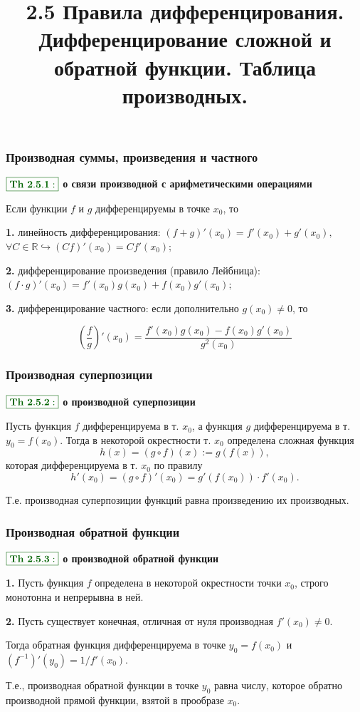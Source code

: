 \documentclass[8pt, aspectratio=169]{beamer}
\title{\textbf{2.5 Правила дифференцирования. \newline Дифференцирование сложной и обратной функции. \newline Таблица производных.}}
\author{}
\institute{}
\date{}
\newcommand{\Th}[1]{{\color{darkgreen}\boxed{\color{darkgreen}\mathbf{Th~#1:}}}}
\begin{document}
\begin{frame}
\titlepage
\end{frame}

\begin{frame}
\frametitle{Производная суммы, произведения и частного}

$\Th{2.5.1}$ \textbf{о связи производной с арифметическими операциями}

Если функции $f$ и $g$ дифференцируемы в точке $x_0$, то

\textbf{1.} линейность дифференцирования:
$(f + g)'(x_0) = f'(x_0) + g'(x_0),$ $\forall C \in \mathbb{R} \hookrightarrow (Cf)'(x_0) = Cf'(x_0);$

\textbf{2.} дифференцирование произведения (правило Лейбница):
$(f \cdot g)'(x_0) = f'(x_0)g(x_0) + f(x_0)g'(x_0);$

\textbf{3.} дифференцирование частного:
если дополнительно $g(x_0) \neq 0$, то

$$\left(\frac{f}{g}\right)' (x_0) = \frac{f'(x_0)g(x_0) - f(x_0)g'(x_0)}{g^2(x_0)}$$
\end{frame}

\begin{frame}
\frametitle{Производная суперпозиции}

$\Th{2.5.2}$ \textbf{о производной суперпозиции}

Пусть функция $f$ дифференцируема в т. $x_0$, а функция $g$ дифференцируема в т. $y_0 = f(x_0)$. Тогда в некоторой окрестности т. $x_0$ определена сложная функция
$$h(x) = (g \circ f)(x) := g(f(x)),$$
которая дифференцируема в т. $x_0$ по правилу
$$h'(x_0) = (g \circ f)'(x_0) = g'(f(x_0)) \cdot f'(x_0).$$

Т.е. производная суперпозиции функций равна произведению их производных.
\end{frame}

\begin{frame}
\frametitle{Производная обратной функции}

$\Th{2.5.3}$ \textbf{о производной обратной функции}

\textbf{1.} Пусть функция $f$ определена в некоторой окрестности точки $x_0$, строго монотонна и непрерывна в ней.

\textbf{2.} Пусть существует конечная, отличная от нуля производная $f'(x_0) \neq 0$.

Тогда обратная функция дифференцируема в точке $y_0 = f(x_0)$ и $(f^{-1})'(y_0) = 1/f'(x_0)$.

\vspace{0.5cm}

Т.е., производная обратной функции в точке $y_0$ равна числу, которое обратно производной прямой функции, взятой в прообразе $x_0$.
\end{frame}
\end{document}
